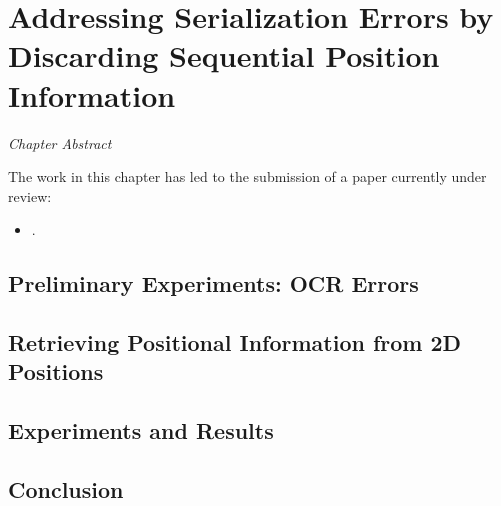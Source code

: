 
\chapter{Addressing Serialization Errors by Discarding Sequential Position Information}
\label{chapter:chapter4}

\renewcommand{\leftmark}{\spacedlowsmallcaps{Addressing Serialization Errors by Discarding Sequential Position Information}}

\begin{chapabstract}
    {\em
    Chapter Abstract


    \vspace*{5mm}
    The work in this chapter has led to the submission of a paper currently under review:}
    \begin{itemize}
        \item \small \fullcite{}.
    \end{itemize}
\end{chapabstract}



\newpage

\minitoc
{}

\section{Preliminary Experiments: OCR Errors}


\section{Retrieving Positional Information from 2D Positions}

\section{Experiments and Results}

\section{Conclusion}
